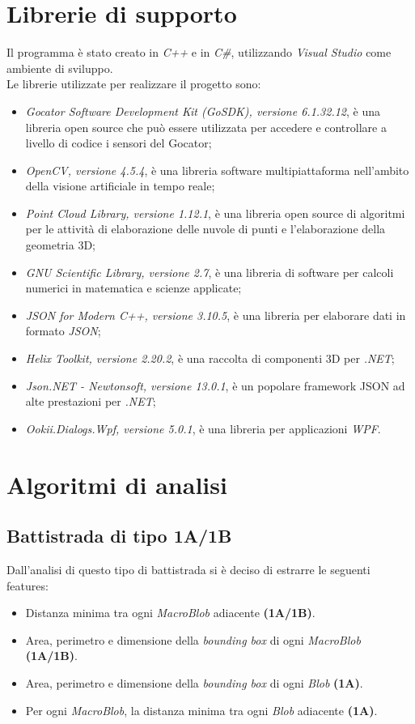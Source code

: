 \newpage

\section{Librerie di supporto}
Il programma è stato creato in \textit{C++} e in \textit{C\#}, utilizzando \textit{Visual Studio} come ambiente di sviluppo.\\
\newline
Le librerie utilizzate per realizzare il progetto sono:
\begin{itemize}
	\item \textit{Gocator Software Development Kit (GoSDK), versione 6.1.32.12}, è una libreria open source che può essere utilizzata per accedere e controllare a livello di codice i sensori del Gocator;
	\item \textit{OpenCV, versione 4.5.4}, è una libreria software multipiattaforma nell'ambito della visione artificiale in tempo reale;
	\item \textit{Point Cloud Library, versione 1.12.1}, è una libreria open source di algoritmi per le attività di elaborazione delle nuvole di punti e l'elaborazione della geometria 3D;
	\item \textit{GNU Scientific Library, versione 2.7}, è una libreria di software per calcoli numerici in matematica e scienze applicate;
	\item \textit{JSON for Modern C++, versione 3.10.5}, è una libreria per elaborare dati in formato \textit{JSON};
	\item \textit{Helix Toolkit, versione 2.20.2}, è una raccolta di componenti 3D per \textit{.NET};
	\item \textit{Json.NET - Newtonsoft, versione 13.0.1}, è un popolare framework JSON ad alte prestazioni per \textit{.NET};
	\item \textit{Ookii.Dialogs.Wpf, versione 5.0.1}, è una libreria per applicazioni \textit{WPF}.
\end{itemize}

\section{Algoritmi di analisi}

\subsection{Battistrada di tipo 1A/1B}
Dall'analisi di questo tipo di battistrada si è deciso di estrarre le seguenti features:
\begin{itemize}
	\item Distanza minima tra ogni \textit{MacroBlob} adiacente \textbf{(1A/1B)}.
	\item Area, perimetro e dimensione della \textit{bounding box} di ogni \textit{MacroBlob} \textbf{(1A/1B)}.
	\item Area, perimetro e dimensione della \textit{bounding box} di ogni \textit{Blob} \textbf{(1A)}.
	\item Per ogni \textit{MacroBlob}, la distanza minima tra ogni \textit{Blob} adiacente \textbf{(1A)}.
\end{itemize}

